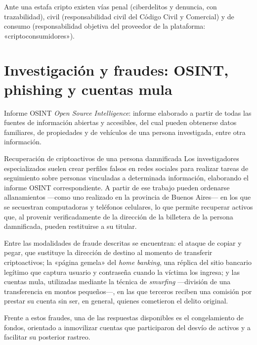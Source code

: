 \documentclass[12pt,oneside]{book}
\begin{document}
\begin{important}
Ante una estafa cripto existen vías penal (ciberdelitos y denuncia, con trazabilidad), civil (responsabilidad civil del Código Civil y Comercial) y de consumo (responsabilidad objetiva del proveedor de la plataforma: «criptoconsumidores»).
\end{important}

\section{Investigación y fraudes: OSINT, phishing y cuentas mula}

\begin{definition}{Informe OSINT}
\textit{Open Source Intelligence}: informe elaborado a partir de todas las fuentes de información abiertas y accesibles, del cual pueden obtenerse datos familiares, de propiedades y de vehículos de una persona investigada, entre otra información.
\end{definition}

\begin{example}{Recuperación de criptoactivos de una persona damnificada}
Los investigadores especializados suelen crear perfiles falsos en redes sociales para realizar tareas de seguimiento sobre personas vinculadas a determinada información, elaborando el informe OSINT correspondiente. A partir de ese trabajo pueden ordenarse allanamientos —como uno realizado en la provincia de Buenos Aires— en los que se secuestran computadoras y teléfonos celulares, lo que permite recuperar activos que, al provenir verificadamente de la dirección de la billetera de la persona damnificada, pueden restituirse a su titular.
\end{example}

\begin{important}
Entre las modalidades de fraude descritas se encuentran: el ataque de copiar y pegar, que sustituye la dirección de destino al momento de transferir criptoactivos; la «página gemela» del \textit{home banking}, una réplica del sitio bancario legítimo que captura usuario y contraseña cuando la víctima los ingresa; y las cuentas mula, utilizadas mediante la técnica de \textit{smurfing} —división de una transferencia en montos pequeños—, en las que terceros reciben una comisión por prestar su cuenta sin ser, en general, quienes cometieron el delito original.
\end{important}

Frente a estos fraudes, una de las respuestas disponibles es el congelamiento de fondos, orientado a inmovilizar cuentas que participaron del desvío de activos y a facilitar su posterior rastreo.
\end{document}

